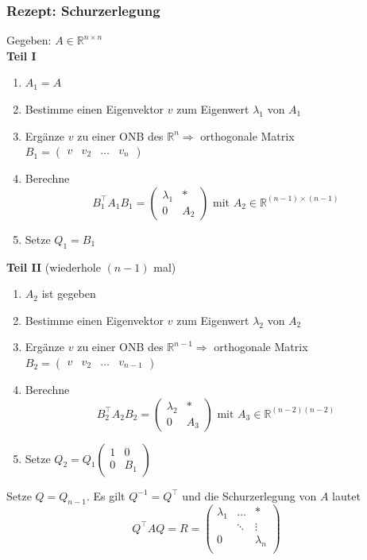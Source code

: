 \documentclass[6pt,a4paper]{scrartcl}
\begin{document}
\begin{multicols*}{4}
\subsubsection{Rezept: Schurzerlegung}
Gegeben: $A\in \mathbb{R}^{n\times n}$ \\
\textbf{Teil I}
\begin{enumerate}\itemsep0pt
\item $A_1=A$
\item Bestimme einen Eigenvektor $v$ zum Eigenwert $\lambda_1$ von $A_1$
\item Ergänze $v$ zu einer ONB des $\mathbb{R}^n \Rightarrow$ orthogonale Matrix $B_1=\begin{pmatrix}
v & v_2 & \dots & v_n
\end{pmatrix}$
\item Berechne
\begin{equation*}
B_1^\top A_1 B_1=\begin{pmatrix}
\lambda_1 & \ast\\
0 & A_2
\end{pmatrix} 
\text{ mit } A_2\in \mathbb{R}^{(n-1)\times(n-1)}
\end{equation*}
\item Setze $Q_1=B_1$
\end{enumerate}
\textbf{Teil II} (wiederhole $(n-1)$ mal)
\begin{enumerate}\itemsep0pt
\item $A_2$ ist gegeben
\item Bestimme einen Eigenvektor $v$ zum Eigenwert $\lambda_2$ von $A_2$
\item Ergänze $v$ zu einer ONB des $\mathbb{R}^{n-1} \Rightarrow$ orthogonale Matrix $B_2=\begin{pmatrix}
v & v_2 & \dots & v_{n-1}
\end{pmatrix}$
\item Berechne
\begin{equation*}
B_2^\top A_2 B_2=\begin{pmatrix}
\lambda_2 & \ast\\
0 & A_3
\end{pmatrix} 
\text{ mit } A_3\in \mathbb{R}^{(n-2)(n-2)}
\end{equation*}
\item Setze $Q_2=Q_1\begin{pmatrix}
1 & 0\\
0 & B_1
\end{pmatrix}$
\end{enumerate}
Setze $Q=Q_{n-1}$. Es gilt $Q^{-1}=Q^\top$ und die Schurzerlegung von $A$ lautet
\begin{equation*}
Q^\top AQ=R=\begin{pmatrix}
\lambda_1 & \dots & \ast \\
 & \ddots & \vdots \\
0 &  & \lambda_n \\
\end{pmatrix}
\end{equation*}

\end{multicols*}
\end{document}
